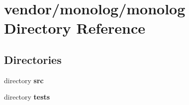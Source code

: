 \section{vendor/monolog/monolog Directory Reference}
\label{dir_e0e927b30e007fa643b999e240be9a3c}
\subsection*{Directories}
\begin{DoxyCompactItemize}
\item 
directory {\bf src}
\item 
directory {\bf tests}
\end{DoxyCompactItemize}
